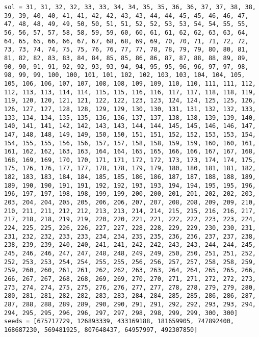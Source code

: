 \begin{lstlisting}[label={lst:call300vehicle90},caption=Optimal solution call\_300\_vehicle\_90]
sol = 31, 31, 32, 32, 33, 33, 34, 34, 35, 35, 36, 36, 37, 37, 38, 38, 39, 39, 40, 40, 41, 41, 42, 42, 43, 43, 44, 44, 45, 45, 46, 46, 47, 47, 48, 48, 49, 49, 50, 50, 51, 51, 52, 52, 53, 53, 54, 54, 55, 55, 56, 56, 57, 57, 58, 58, 59, 59, 60, 60, 61, 61, 62, 62, 63, 63, 64, 64, 65, 65, 66, 66, 67, 67, 68, 68, 69, 69, 70, 70, 71, 71, 72, 72, 73, 73, 74, 74, 75, 75, 76, 76, 77, 77, 78, 78, 79, 79, 80, 80, 81, 81, 82, 82, 83, 83, 84, 84, 85, 85, 86, 86, 87, 87, 88, 88, 89, 89, 90, 90, 91, 91, 92, 92, 93, 93, 94, 94, 95, 95, 96, 96, 97, 97, 98, 98, 99, 99, 100, 100, 101, 101, 102, 102, 103, 103, 104, 104, 105, 105, 106, 106, 107, 107, 108, 108, 109, 109, 110, 110, 111, 111, 112, 112, 113, 113, 114, 114, 115, 115, 116, 116, 117, 117, 118, 118, 119, 119, 120, 120, 121, 121, 122, 122, 123, 123, 124, 124, 125, 125, 126, 126, 127, 127, 128, 128, 129, 129, 130, 130, 131, 131, 132, 132, 133, 133, 134, 134, 135, 135, 136, 136, 137, 137, 138, 138, 139, 139, 140, 140, 141, 141, 142, 142, 143, 143, 144, 144, 145, 145, 146, 146, 147, 147, 148, 148, 149, 149, 150, 150, 151, 151, 152, 152, 153, 153, 154, 154, 155, 155, 156, 156, 157, 157, 158, 158, 159, 159, 160, 160, 161, 161, 162, 162, 163, 163, 164, 164, 165, 165, 166, 166, 167, 167, 168, 168, 169, 169, 170, 170, 171, 171, 172, 172, 173, 173, 174, 174, 175, 175, 176, 176, 177, 177, 178, 178, 179, 179, 180, 180, 181, 181, 182, 182, 183, 183, 184, 184, 185, 185, 186, 186, 187, 187, 188, 188, 189, 189, 190, 190, 191, 191, 192, 192, 193, 193, 194, 194, 195, 195, 196, 196, 197, 197, 198, 198, 199, 199, 200, 200, 201, 201, 202, 202, 203, 203, 204, 204, 205, 205, 206, 206, 207, 207, 208, 208, 209, 209, 210, 210, 211, 211, 212, 212, 213, 213, 214, 214, 215, 215, 216, 216, 217, 217, 218, 218, 219, 219, 220, 220, 221, 221, 222, 222, 223, 223, 224, 224, 225, 225, 226, 226, 227, 227, 228, 228, 229, 229, 230, 230, 231, 231, 232, 232, 233, 233, 234, 234, 235, 235, 236, 236, 237, 237, 238, 238, 239, 239, 240, 240, 241, 241, 242, 242, 243, 243, 244, 244, 245, 245, 246, 246, 247, 247, 248, 248, 249, 249, 250, 250, 251, 251, 252, 252, 253, 253, 254, 254, 255, 255, 256, 256, 257, 257, 258, 258, 259, 259, 260, 260, 261, 261, 262, 262, 263, 263, 264, 264, 265, 265, 266, 266, 267, 267, 268, 268, 269, 269, 270, 270, 271, 271, 272, 272, 273, 273, 274, 274, 275, 275, 276, 276, 277, 277, 278, 278, 279, 279, 280, 280, 281, 281, 282, 282, 283, 283, 284, 284, 285, 285, 286, 286, 287, 287, 288, 288, 289, 289, 290, 290, 291, 291, 292, 292, 293, 293, 294, 294, 295, 295, 296, 296, 297, 297, 298, 298, 299, 299, 300, 300]
seeds = [675717729, 126893339, 433169188, 181659905, 747892400, 168687230, 569481925, 807648437, 64957997, 492307850]
\end{lstlisting}
\clearpage


